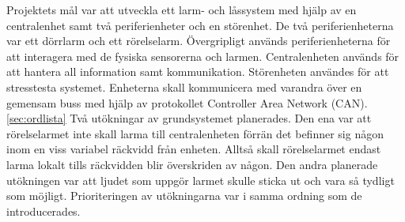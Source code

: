 
Projektets mål var att utveckla ett larm- och låssystem med hjälp av en centralenhet samt två periferienheter och en störenhet. De två periferienheterna var ett dörrlarm och ett rörelselarm. 
Övergripligt används periferienheterna för att interagera med de fysiska sensorerna och larmen. Centralenheten används för att hantera all information samt kommunikation. Störenheten användes för att stresstesta systemet. Enheterna skall kommunicera med varandra över en gemensam buss med hjälp av protokollet Controller Area Network (CAN).\ref{sec:ordlista} 
\newline\newline
Två utökningar av grundsystemet planerades. Den ena var att rörelselarmet inte skall larma till centralenheten förrän det befinner sig någon inom en viss variabel räckvidd från enheten. Alltså skall rörelselarmet endast larma lokalt tills räckvidden blir överskriden av någon. Den andra planerade utökningen var att ljudet som uppgör larmet skulle sticka ut och vara så tydligt som möjligt. Prioriteringen av utökningarna var i samma ordning som de introducerades.

